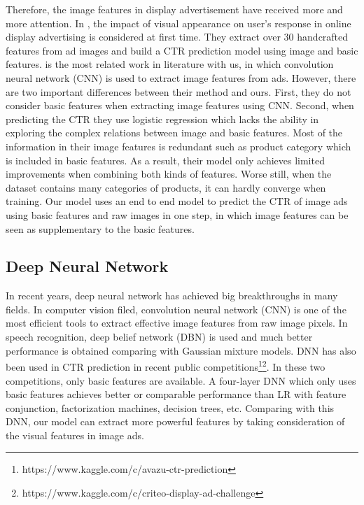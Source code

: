 \documentclass{sig-alternate}
\begin{document}
Therefore, the image features in display advertisement have received more and more attention. In \cite{azimi2012impact,cheng2012multimedia}, the impact of  visual appearance  on user's response in online display advertising is considered at first time. They extract over 30 handcrafted features from ad images and build a CTR prediction model using image and basic  features.   \cite{Mo:2015:IFL:2832747.2832769} is the most related work  in literature with us, in which convolution neural network (CNN) is used to extract image features from ads. However, there are two important differences between their method and ours.   First, they do not consider basic features when extracting image features using CNN. Second,  when predicting the CTR they  use logistic regression which lacks the ability in exploring the complex relations between image and basic features. Most of the information in their image features is redundant  such as product category which is included in basic features. As a result, their model only achieves limited improvements when combining both kinds of features. Worse still, when the dataset contains many categories of products, it can hardly converge when training. Our model uses an end to end model to predict the CTR of image ads using basic features and raw images in one step, in which image features can be seen as  supplementary to the basic features.
\subsection{Deep Neural Network} 
In recent years, deep neural network has achieved big breakthroughs in many fields. In computer vision filed, convolution neural network (CNN) \cite{NIPS2012_4824} is one of the most efficient tools to extract effective image features from raw image pixels.  In speech recognition, deep belief network (DBN) \cite{hinton2012deep} is used and much better performance is obtained comparing with Gaussian mixture models. DNN has also been used in CTR prediction in recent public competitions\footnote{https://www.kaggle.com/c/avazu-ctr-prediction}\footnote{https://www.kaggle.com/c/criteo-display-ad-challenge}. In these two competitions, only basic features are available. A four-layer DNN which only uses basic features achieves better or comparable performance than LR with feature conjunction, factorization machines, decision trees, etc. Comparing with this DNN, our model can extract more powerful features by taking consideration  of the visual features in image ads. 
\end{document}
